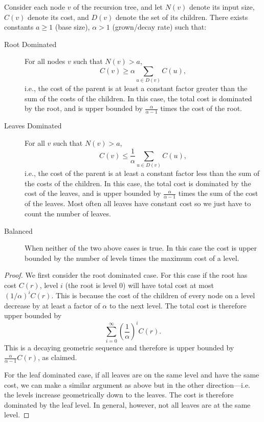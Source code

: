 \begin{flex}
\begin{definition}
\label{def:analysis::brick-method}
Consider each node $v$ of the recursion tree, and let $N(v)$ denote  
its input size, $C(v)$ denote its cost, and $D(v)$ denote the set of
its children.   There exists constants $a \geq 1$ (base size), $\alpha
> 1$ (grown/decay rate) such that:

\begin{description}

\item[Root Dominated]
For all nodes $v$ such that $N(v) > a$,
\[C(v) \geq \alpha \sum_{u \in D(v)} C(u),\]
i.e., the cost of the parent is at least a
constant factor greater than the sum of the 
costs of the children.  In this case, the total cost is dominated by
the root, and is upper bounded 
by $\frac{\alpha}{\alpha - 1}$ times the cost of the root. 

\item[Leaves Dominated]
For all $v$ such that $N(v) > a$, 
\[C(v) \leq \frac{1}{\alpha} \sum_{u \in D(v)} C(u),\]
i.e., the cost of the parent is at least a
constant factor less than the sum of the costs of the 
children.   In this case,
the total cost is dominated by the cost of the leaves, and is upper bounded by $\frac{\alpha}{\alpha - 1}$ times the
sum of the cost of the leaves.
Most often all leaves have constant cost so we just have to count the
number of leaves.

\item[Balanced]
When neither of the two above cases is true.     In this case the cost
is upper bounded by the number of levels times the maximum cost of a
level.
\end{description}
\end{definition}

\begin{proof}
  We first consider the root dominated case.  For this case if the
  root has cost $C(r)$, level $i$ (the root is level $0$) will have
  total cost at most $(1/\alpha)^i C(r)$.  
%
  This is because the cost of the children of every node on a level
  decrease by at least a factor of $\alpha$ to the next level.  
%
  The total cost is therefore upper bounded by
  \[ \sum_{i=0}^{\infty} \left(\frac{1}{\alpha}\right)^i C(r).   \]
%
  This is a decaying geometric sequence and therefore is upper bounded
  by $\frac{\alpha}{\alpha - 1} C(r)$, as claimed.

  For the leaf dominated case, if all leaves are on the same level and
  have the same cost, we can make a
  similar argument as above but in the other direction---i.e. the
  levels increase geometrically down to the leaves.    The cost is
  therefore dominated by the leaf level.
%
  In general, however, not all leaves are at the same level.


\end{proof}
\end{flex}
